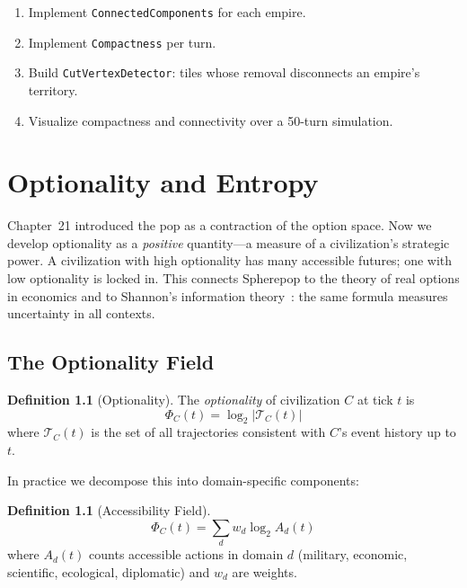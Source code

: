 \documentclass[11pt,a4paper,openany]{book}
\theoremstyle{plain}
\theoremstyle{definition}
\newtheorem{definition}[theorem]{Definition}
\theoremstyle{remark}
\newenvironment{background}{%
  \begin{mdframed}[
    linecolor=sphereblue!40, backgroundcolor=sphereblue!5,
    linewidth=1pt, innertopmargin=8pt, innerbottommargin=8pt,
    innerleftmargin=10pt, innerrightmargin=10pt,
    skipabove=10pt, skipbelow=6pt
  ]%
  \setlength{\parindent}{0pt}%
  \noindent{\textcolor{sphereblue}{\textbf{Background}}}\par\smallskip\ignorespaces
}{\end{mdframed}}
\newenvironment{project}[1]{%
  \begin{tcolorbox}[
    title={\textbf{Project: #1}},
    colback=projectbg,
    colframe=sphereblue,
    fonttitle=\bfseries\color{white},
    coltitle=white,
    attach boxed title to top left={yshift=-2mm, xshift=4mm},
    boxed title style={colback=sphereblue, sharp corners},
    sharp corners,
    breakable,
    before upper={\normalfont\setlength{\parindent}{0pt}\tolerance=9999\hbadness=9999}
  ]
}{\end{tcolorbox}}
\begin{document}
\begin{project}{Region-Based Territorial Reasoning}
  \begin{enumerate}
    \item Implement \texttt{ConnectedComponents} for each empire.
    \item Implement \texttt{Compactness} per turn.
    \item Build \texttt{CutVertexDetector}: tiles whose removal
          disconnects an empire's territory.
    \item Visualize compactness and connectivity over a 50-turn simulation.
  \end{enumerate}
\end{project}

\chapter{Optionality and Entropy}
\label{ch:optionality}

\begin{background}
  Chapter~21 introduced the pop as a contraction of the option space.
  Now we develop optionality as a \emph{positive} quantity---a measure
  of a civilization's strategic power. A civilization with high
  optionality has many accessible futures; one with low optionality
  is locked in. This connects Spherepop to the theory of real options
  in economics and to Shannon's information theory~\cite{Shannon}: the
  same formula measures uncertainty in all contexts.
\end{background}

\section{The Optionality Field}

\begin{definition}[Optionality]
  The \emph{optionality} of civilization $C$ at tick $t$ is
  \[
    \Phi_C(t) = \log_2 |\mathcal{T}_C(t)|
  \]
  where $\mathcal{T}_C(t)$ is the set of all trajectories consistent
  with $C$'s event history up to $t$.
\end{definition}

In practice we decompose this into domain-specific components:

\begin{definition}[Accessibility Field]
  \[
    \Phi_C(t) = \sum_{d} w_d \log_2 A_d(t)
  \]
  where $A_d(t)$ counts accessible actions in domain $d$ (military,
  economic, scientific, ecological, diplomatic) and $w_d$ are weights.
\end{definition}
\end{document}
